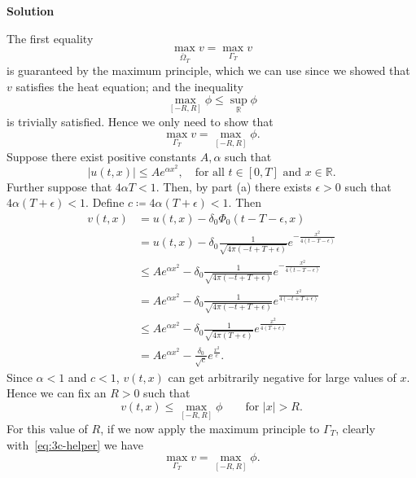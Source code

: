 \documentclass{article}
\begin{document}
\textbf{Solution}

The first equality
%
\begin{equation*}
    \max_{\bar{\Omega}_T} v = \max_{\Gamma_T} v
\end{equation*}
%
is guaranteed by the maximum principle, which we can use since we showed
that $v$ satisfies the heat equation; and the inequality
%
\begin{equation*}
    \max_{[-R, R]} \phi \leq \sup_\mathbb{R} \phi
\end{equation*}
%
is trivially satisfied. Hence we only need to show that
%
\begin{equation*}
    \max_{\Gamma_T} v = \max_{[-R, R]} \phi
    .
\end{equation*}
%
Suppose there exist positive constants $A, \alpha$ such that
%
\begin{equation*}
    |u(t, x)| \leq A e^{\alpha x^2},
    \quad \text{for all } t \in [0, T] \text{ and } x \in \mathbb{R}
    .
\end{equation*}
%
Further suppose that $4 \alpha T < 1$. Then, by part (a) there exists
$\epsilon > 0$ such that $4 \alpha (T + \epsilon) < 1$. Define $c
\coloneqq 4 \alpha (T + \epsilon) < 1$. Then
%
\begin{align*}
    v(t, x)
        &= u(t, x) - \delta_0 \Phi_0(t - T - \epsilon, x) \\
        &= u(t, x) - \delta_0
            \frac{1}{\sqrt{4 \pi (- t + T + \epsilon)}}
            e^{- \frac{x^2}{4 (t - T - \epsilon)}} \\
        &\leq A e^{\alpha x^2} - \delta_0
            \frac{1}{\sqrt{4 \pi (- t + T + \epsilon)}}
            e^{- \frac{x^2}{4 (t - T - \epsilon)}} \\
        &= A e^{\alpha x^2} - \delta_0
            \frac{1}{\sqrt{4 \pi (- t + T + \epsilon)}}
            e^{\frac{x^2}{4 (-t + T + \epsilon)}} \\
        &\leq A e^{\alpha x^2} - \delta_0
            \frac{1}{\sqrt{4 \pi (T + \epsilon)}}
            e^{\frac{x^2}{4 (T + \epsilon)}} \\
        &= A e^{\alpha x^2} - \frac{\delta_0}{\sqrt{c}} e^{\frac{x^2}{c}}
        .
\end{align*}
%
Since $\alpha < 1$ and $c < 1$, $v(t, x)$ can get arbitrarily negative
for large values of $x$. Hence we can fix an $R > 0$ such that
%
\begin{equation}
    v(t, x) \leq \max_{[-R, R]} \phi \qquad \text{for } |x| > R.
    \label{eq:3c-helper}
\end{equation}
%
For this value of $R$, if we now apply the maximum principle to
$\Gamma_T$, clearly with~\eqref{eq:3c-helper} we have
%
\begin{equation*}
    \max_{\Gamma_T} v = \max_{[-R, R]} \phi
    .
\end{equation*}
\end{document}

